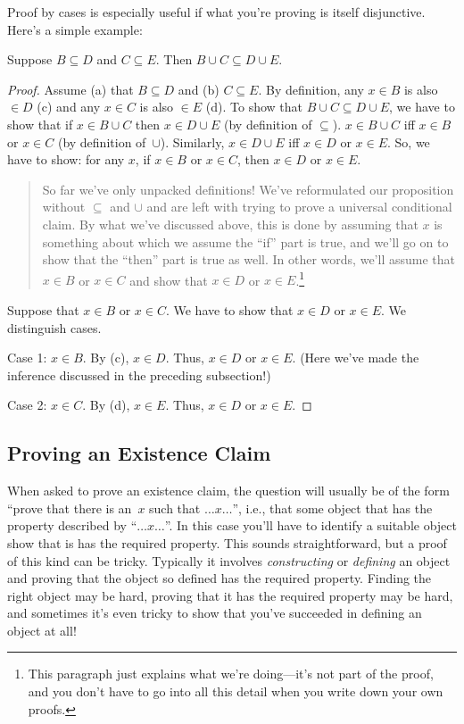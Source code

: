 \documentclass[../../../include/open-logic-section]{subfiles}
\begin{document}
Proof by cases is especially useful if what you're proving is itself
disjunctive. Here's a simple example:

\begin{prop}
Suppose $B \subseteq D$ and $C \subseteq E$. Then $B \cup C \subseteq
D \cup E$.
\end{prop}

\begin{proof}
  Assume (a) that $B \subseteq D$ and (b) $C \subseteq E$. By
  definition, any $x \in B$ is also $\in D$ (c) and any $x \in C$ is
  also $\in E$ (d).  To show that $B \cup C \subseteq D \cup E$, we
  have to show that if $x \in B \cup C$ then $x \in D \cup E$ (by
  definition of $\subseteq$). $x \in B \cup C$ iff $x \in B$ or $x \in
  C$ (by definition of~$\cup$). Similarly, $x \in D \cup E$ iff $x \in
  D$ or $x \in E$. So, we have to show: for any $x$, if $x \in B$ or
  $x \in C$, then $x \in D$ or $x \in E$.

  \begin{quote}
  So far we've only unpacked definitions!{} We've reformulated our
  proposition without $\subseteq$ and $\cup$ and are left with trying
  to prove a universal conditional claim. By what we've discussed
  above, this is done by assuming that $x$ is something about which we
  assume the ``if'' part is true, and we'll go on to show that the
  ``then'' part is true as well. In other words, we'll assume that $x
  \in B$ or $x \in C$ and show that $x \in D$ or $x \in
  E$.\footnote{This paragraph just explains what we're doing---it's
    not part of the proof, and you don't have to go into all this
    detail when you write down your own proofs.}
  \end{quote}

  Suppose that $x \in B$ or $x \in C$. We have to show that $x \in D$
  or $x \in E$. We distinguish cases.

  Case 1: $x \in B$. By (c), $x \in D$. Thus, $x \in D$ or $x \in
  E$. (Here we've made the inference discussed in the preceding
  subsection!)
      
  Case 2: $x \in C$. By (d), $x \in E$. Thus, $x \in D$ or $x \in E$.
 \end{proof}


\subsection{Proving an Existence Claim}

When asked to prove an existence claim, the question will usually be
of the form ``prove that there is an~$x$ such that $\dots x \dots$'',
i.e., that some object that has the property described by ``$\dots x
\dots$''. In this case you'll have to identify a suitable object show
that is has the required property.  This sounds straightforward, but a
proof of this kind can be tricky. Typically it involves
\emph{constructing} or \emph{defining} an object and proving that the
object so defined has the required property. Finding the right object
may be hard, proving that it has the required property may be hard,
and sometimes it's even tricky to show that you've succeeded in
defining an object at all!{}
\end{document}
